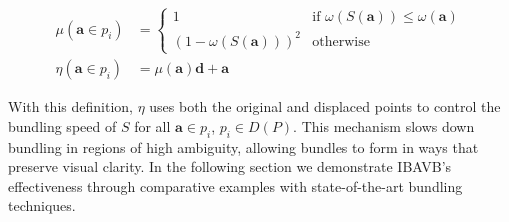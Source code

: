 \begin{align}
\mu(\mathbf{a} \in p_i) &=
\begin{cases}
    1                             & \mbox{if } \omega(S(\mathbf{a})) \leq \omega(\mathbf{a}) \\
    (1 - \omega(S(\mathbf{a})))^2 & \mbox{otherwise}
\end{cases} \\
\eta(\mathbf{a} \in p_i) &= \mu(\mathbf{a})\mathbf{d} + \mathbf{a}
\end{align}
 
With this definition, $\eta$ uses both the original and displaced points to control the bundling speed of $S$ for all $\mathbf{a} \in p_i$, $p_i \in D(P)$. This mechanism slows down bundling in regions of high ambiguity, allowing bundles to form in ways that preserve visual clarity. In the following section we demonstrate IBAVB's effectiveness through comparative examples with state-of-the-art bundling techniques.
